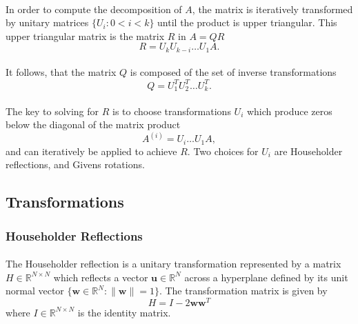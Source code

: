 \documentclass{article}
\begin{document}
\paragraph{}
In order to compute the decomposition of $A$, the matrix is iteratively transformed by unitary matrices $\{U_i : 0 < i < k\}$ until the product is upper triangular. This upper triangular matrix is the matrix $R$ in $A = QR$
\begin{equation}
	\label{eqn:r}
R = U_kU_{k-i} \dots U_1A.
\end{equation}
\paragraph{}
It follows, that the matrix $Q$ is composed of the set of inverse transformations
\begin{equation}
	\label{eqn:q}
Q = U_{1}^{T}U_{2}^{T} \dots U_{k}^{T}.
\end{equation}
\paragraph{}
The key to solving for $R$ is to choose transformations $U_i$ which produce zeros below the diagonal of the matrix product
\begin{equation}
	\label{eqn:update}
A^{(i)} = U_{i} \dots U_1A,
\end{equation}
and can iteratively be applied to achieve $R$. Two choices for $U_i$ are Householder reflections, and Givens rotations.

\subsection{Transformations}
\subsubsection{Householder Reflections}
\paragraph{}
The Householder reflection is a unitary transformation represented by a matrix $H\in\mathbb{R}^{N\times{}N}$ which reflects a vector $\mathbf{u}\in\mathbb{R}^N$ across a hyperplane defined by its unit normal vector $\{\mathbf{w}\in\mathbb{R}^N: \|\mathbf{w}\|=1\}$. The transformation matrix is given by
\begin{equation}
	\label{eqn:Householder}
H = I - 2\mathbf{ww}^T
\end{equation}
where $I\in\mathbb{R}^{N\times{}N}$ is the identity matrix. \cite{bhaskar86}
\end{document}
